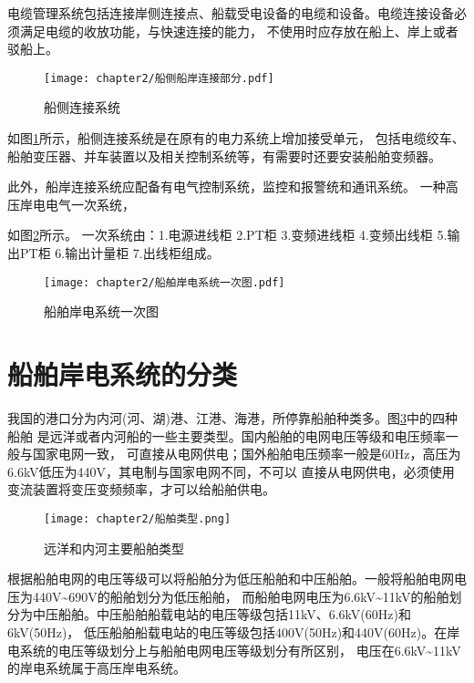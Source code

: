 电缆管理系统包括连接岸侧连接点、船载受电设备的电缆和设备。电缆连接设备必须满足电缆的收放功能，与快速连接的能力，
不使用时应存放在船上、岸上或者驳船上。

\begin{figure}[!htp]
	\centering
	\texttt{[image: chapter2/船侧船岸连接部分.pdf]}
	\caption{船侧连接系统}
	\label{fig:船侧连接系统}
\end{figure}

如图\ref{fig:船侧连接系统}所示，船侧连接系统是在原有的电力系统上增加接受单元，
包括电缆绞车、船舶变压器、并车装置以及相关控制系统等，有需要时还要安装船舶变频器\cite{SP15}。

此外，船岸连接系统应配备有电气控制系统，监控和报警统和通讯系统。
一种高压岸电电气一次系统，

如图\ref{fig:船舶岸电系统一次图}所示。
一次系统由：1.电源进线柜 2.PT柜 3.变频进线柜 4.变频出线柜 5.输出PT柜 6.输出计量柜 7.出线柜组成。

\begin{figure}[!htp]
	\centering
	\texttt{[image: chapter2/船舶岸电系统一次图.pdf]}
	\caption{船舶岸电系统一次图}
	\label{fig:船舶岸电系统一次图}
\end{figure}

\section{船舶岸电系统的分类}

我国的港口分为内河(河、湖)港、江港、海港，所停靠船舶种类多。图\ref{fig:远洋和内河主要船舶类型}中的四种船舶
是远洋或者内河船的一些主要类型。国内船舶的电网电压等级和电压频率一般与国家电网一致，
可直接从电网供电\cite{SP16}；国外船舶电压频率一般是60Hz，高压为6.6kV低压为440V，其电制与国家电网不同，不可以
直接从电网供电，必须使用变流装置将变压变频频率，才可以给船舶供电。

\begin{figure}[!htp]
	\centering
	\texttt{[image: chapter2/船舶类型.png]}
	\caption{远洋和内河主要船舶类型}
	\label{fig:远洋和内河主要船舶类型}
\end{figure}

根据船舶电网的电压等级可以将船舶分为低压船舶和中压船舶。一般将船舶电网电压为440V\~{}690V的船舶划分为低压船舶，
而船舶电网电压为6.6kV\~{}11kV的船舶划分为中压船舶。中压船舶船载电站的电压等级包括11kV、6.6kV(60Hz)和6kV(50Hz)，
低压船舶船载电站的电压等级包括400V(50Hz)和440V(60Hz)\cite{SP15}。在岸电系统的电压等级划分上与船舶电网电压等级划分有所区别，
电压在6.6kV\~{}11kV的岸电系统属于高压岸电系统。

